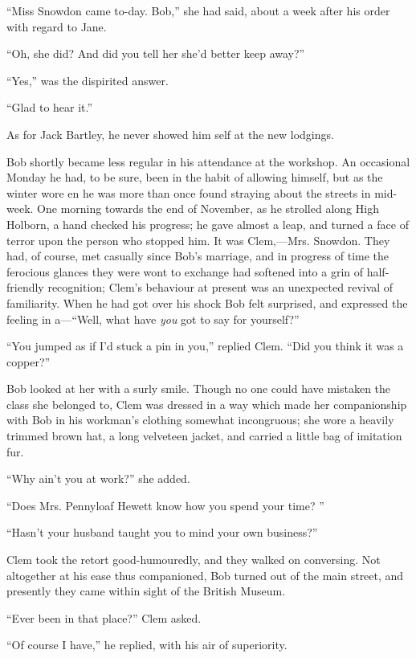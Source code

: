 ``Miss Snowdon came to-day. Bob,'' she had said, about a week after his
order with regard to Jane.

``Oh, she did? And did you tell her she'd better keep away?''

``Yes,'' was the dispirited answer.

{}``Glad to hear it.''

As for Jack Bartley, he never showed him self at the new lodgings.

Bob shortly became less regular in his attendance at the workshop. An
occasional Monday he had, to be sure, been in the habit of allowing
himself, but as the winter wore en he was more than once found straying
about the streets in mid-week. One morning towards the end of November,
as he strolled along High Holborn, a hand checked his progress; he gave
almost a leap, and turned a face of terror upon the person who stopped
him. It was Clem,---Mrs. Snowdon. They had, of course, met casually
since Bob's marriage, and in progress of time the ferocious glances they
were wont to exchange had softened into a grin of half-friendly
recognition; Clem's behaviour at present was an unexpected revival of
familiarity. When he had got over his shock Bob felt surprised, and
expressed the feeling in a---``Well, what have \emph{you} got to say for
yourself?''

``You jumped as if I'd stuck a pin in you,'' {}replied Clem. ``Did you
think it was a copper?''

Bob looked at her with a surly smile. Though no one could have mistaken
the class she belonged to, Clem was dressed in a way which made her
companionship with Bob in his workman's clothing somewhat incongruous;
she wore a heavily trimmed brown hat, a long velveteen jacket, and
carried a little bag of imitation fur.

``Why ain't you at work?'' she added.

``Does Mrs. Pennyloaf Hewett know how you spend your time? ''

``Hasn't your husband taught you to mind your own business?''

Clem took the retort good-humouredly, and they walked on conversing. Not
altogether at his ease thus companioned, Bob turned out of the main
street, and presently they came within sight of the British Museum.

``Ever been in that place?'' Clem asked.

``Of course I have,'' he replied, with his air of superiority.

